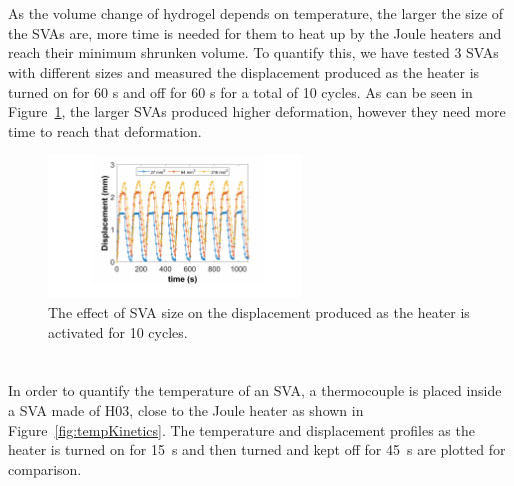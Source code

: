 \section{}
As the volume change of hydrogel depends on temperature, the larger the size of the SVAs are, more time is needed for them to heat up by the Joule heaters and reach their minimum shrunken volume. To quantify this, we have tested 3 SVAs with different sizes and measured the displacement produced as the heater is turned on for 60 s and off for 60 s for a total of 10 cycles. As can be seen in Figure~\ref{fig:svaSize}, the larger SVAs produced higher deformation, however they need more time to reach that deformation. 
\begin{figure}[!htb]
      \centering
      \includegraphics[width=0.6\textwidth]{svaSize.pdf}
      \caption[]{The effect of SVA size on the displacement produced as the heater is activated for 10 cycles.}
      \label{fig:svaSize}
\end{figure}

\section{} 
In order to quantify the temperature of an SVA, a thermocouple is placed inside a SVA made of H03, close to the Joule heater as shown in Figure~\ref{fig:tempKinetics}. The temperature and displacement profiles as the heater is turned on for 15~s and then turned and kept off for 45~s are plotted for comparison.

